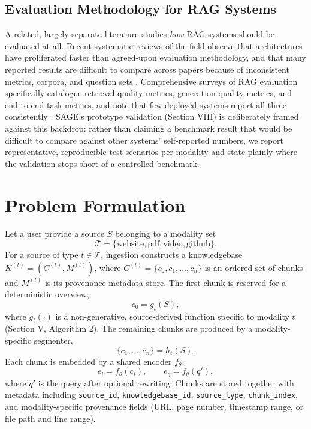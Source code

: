 \documentclass[conference]{IEEEtran}
\begin{document}
\subsection{Evaluation Methodology for RAG Systems}
A related, largely separate literature studies \emph{how} RAG systems
should be evaluated at all. Recent systematic reviews of the field
observe that architectures have proliferated faster than agreed-upon
evaluation methodology, and that many reported results are difficult to
compare across papers because of inconsistent metrics, corpora, and
question sets \cite{slr2025rag}. Comprehensive surveys of RAG evaluation
specifically catalogue retrieval-quality metrics, generation-quality
metrics, and end-to-end task metrics, and note that few deployed systems
report all three consistently \cite{ragevalsurvey2025}. SAGE's prototype
validation (Section VIII) is deliberately framed against this backdrop:
rather than claiming a benchmark result that would be difficult to
compare against other systems' self-reported numbers, we report
representative, reproducible test scenarios per modality and state
plainly where the validation stops short of a controlled benchmark.

\section{Problem Formulation}

Let a user provide a source $S$ belonging to a modality set
\begin{equation}
\mathcal{T} = \{\text{website}, \text{pdf}, \text{video}, \text{github}\}.
\end{equation}
For a source of type $t \in \mathcal{T}$, ingestion constructs a
knowledgebase $K^{(t)} = (C^{(t)}, M^{(t)})$, where
$C^{(t)} = \{c_0, c_1, \dots, c_n\}$ is an ordered set of chunks and
$M^{(t)}$ is its provenance metadata store. The first chunk is reserved
for a deterministic overview,
\begin{equation}
c_0 = g_t(S),
\end{equation}
where $g_t(\cdot)$ is a non-generative, source-derived function specific
to modality $t$ (Section V, Algorithm 2). The remaining chunks are
produced by a modality-specific segmenter,
\begin{equation}
\{c_1, \dots, c_n\} = h_t(S).
\end{equation}
Each chunk is embedded by a shared encoder $f_\theta$,
\begin{equation}
e_i = f_\theta(c_i), \qquad e_q = f_\theta(q'),
\end{equation}
where $q'$ is the query after optional rewriting. Chunks are stored
together with metadata including \texttt{source\_id},
\texttt{knowledgebase\_id}, \texttt{source\_type}, \texttt{chunk\_index},
and modality-specific provenance fields (URL, page number, timestamp
range, or file path and line range).
\end{document}
